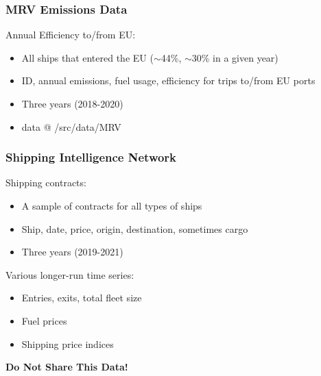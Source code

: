 \documentclass{beamer}
\begin{document}
\begin{frame}
\frametitle{MRV Emissions Data}
\large Annual Efficiency to/from EU:
\vspace{0.2cm}
\normalsize
\begin{itemize}
    \item All ships that entered the EU ($\sim$44\%, $\sim$30\% in a given year)
	\item ID, annual emissions, fuel usage, efficiency for trips to/from EU ports
	\item Three years (2018-2020)
	\item data @ /src/data/MRV
\end{itemize}

\end{frame}


\begin{frame}
\frametitle{Shipping Intelligence Network}

\large Shipping contracts:
\vspace{0.2cm}
\normalsize
\begin{itemize}
    \item A sample of contracts for all types of ships
    \item Ship, date, price, origin, destination, sometimes cargo
    \item Three years (2019-2021)
\end{itemize}

\vfill

\large Various longer-run time series:
\vspace{0.2cm}
\normalsize
\begin{itemize}
    \item Entries, exits, total fleet size 
    \item Fuel prices
    \item Shipping price indices
\end{itemize}

\begin{center}
    \textbf{Do Not Share This Data!}
\end{center}
\end{frame}

\end{document}
